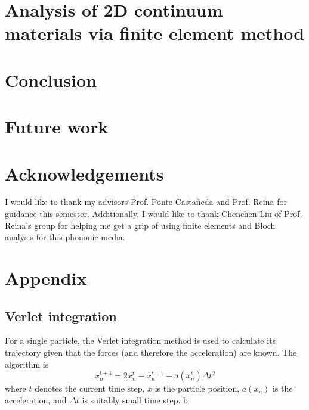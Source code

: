 \documentclass{article}
\begin{document}
\section{Analysis of 2D continuum materials via finite element method}

\section{Conclusion}
\section{Future work}
\section{Acknowledgements}
I would like to thank my advisors Prof. Ponte-Casta\~neda and Prof. Reina for
guidance this semester. Additionally, I would like to thank Chenchen Liu of
Prof. Reina's group for helping me get a grip of using finite elements and Bloch
analysis for this phononic media.

\appendix
\section{Appendix}
\subsection{Verlet integration}
For a single particle, the Verlet integration method is used to calculate its 
trajectory given that the forces (and therefore the acceleration) are known. 
The algorithm is
\begin{equation}
x^{t+1}_{n} = 2x^{t}_{n} - x^{t-1}_{n} + a(x^{t}_n)\Delta t^2
\end{equation}
where $t$ denotes the current time step, $x$ is the particle position, $a(x_n)$ 
is the acceleration, and $\Delta t$ is suitably small time step. b
\end{document}
